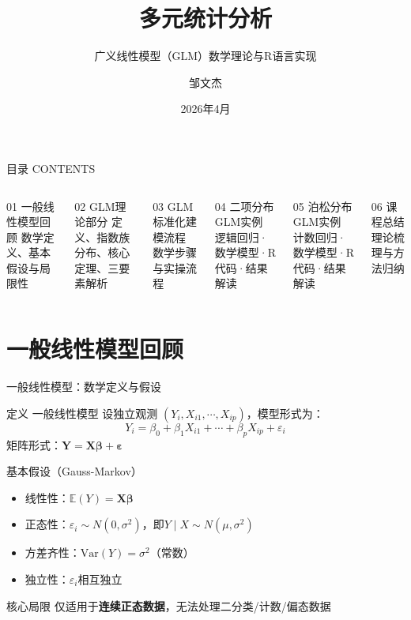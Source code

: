 \documentclass[aspectratio=169]{beamer}
\title{多元统计分析}
\subtitle{广义线性模型（GLM）数学理论与R语言实现}
\author{邹文杰}
\institute{哈尔滨商业大学}
\date{2026年4月}
\begin{document}
\begin{frame}
\titlepage
\end{frame}

\begin{frame}{目录 CONTENTS}
\begin{columns}[T]
\begin{block}{01 一般线性模型回顾}
数学定义、基本假设与局限性
\end{block}
\begin{block}{02 GLM理论部分}
定义、指数族分布、核心定理、三要素解析
\end{block}
\begin{block}{03 GLM标准化建模流程}
数学步骤与实操流程
\end{block}
\begin{block}{04 二项分布GLM实例}
逻辑回归·数学模型·R代码·结果解读
\end{block}
\begin{block}{05 泊松分布GLM实例}
计数回归·数学模型·R代码·结果解读
\end{block}
\begin{block}{06 课程总结}
理论梳理与方法归纳
\end{block}
\end{columns}
\end{frame}


\section{一般线性模型回顾}

\begin{frame}{一般线性模型：数学定义与假设}
\begin{block}{定义 一般线性模型}
设独立观测 $(Y_i, X_{i1},\cdots,X_{ip})$，模型形式为：
\[ Y_i = \beta_0+\beta_1X_{i1}+\cdots+\beta_pX_{ip}+\varepsilon_i \]
矩阵形式：$\boldsymbol{Y}=\boldsymbol{X\beta}+\boldsymbol{\varepsilon}$
\end{block}
\begin{block}{基本假设（Gauss-Markov）}
\begin{itemize}
\item 线性性：$\mathbb{E}(Y)=\boldsymbol{X\beta}$
\item 正态性：$\varepsilon_i\sim N(0,\sigma^2)$，即$Y\mid X\sim N(\mu,\sigma^2)$
\item 方差齐性：$\text{Var}(Y)=\sigma^2$（常数）
\item 独立性：$\varepsilon_i$相互独立
\end{itemize}
\end{block}
\begin{alertblock}{核心局限}
仅适用于\textbf{连续正态数据}，无法处理二分类/计数/偏态数据
\end{alertblock}
\end{frame}
\end{document}
